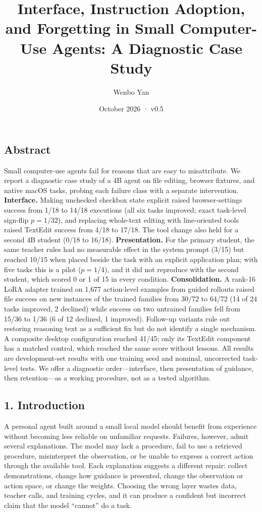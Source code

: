 \documentclass[
  10pt,
]{article}
\title{Interface, Instruction Adoption, and Forgetting in Small
Computer-Use Agents: A Diagnostic Case Study}
\author{Wenbo Yan}
\date{October 2026 · v0.5}
\begin{document}
\maketitle

\subsection{Abstract}\label{abstract}

Small computer-use agents fail for reasons that are easy to
misattribute. We report a diagnostic case study of a 4B agent on file
editing, browser fixtures, and native macOS tasks, probing each failure
class with a separate intervention. \textbf{Interface.} Making unchecked
checkbox state explicit raised browser-settings success from 1/18 to
14/18 executions (all six tasks improved; exact task-level sign-flip
\(p=1/32\)), and replacing whole-text editing with line-oriented tools
raised TextEdit success from 4/18 to 17/18. The tool change also held
for a second 4B student (0/18 to 16/18). \textbf{Presentation.} For the
primary student, the same teacher rules had no measurable effect in the
system prompt (3/15) but reached 10/15 when placed beside the task with
an explicit application plan; with five tasks this is a pilot
(\(p=1/4\)), and it did not reproduce with the second student, which
scored 0 or 1 of 15 in every condition. \textbf{Consolidation.} A
rank-16 LoRA adapter trained on 1,677 action-level examples from guided
rollouts raised file success on new instances of the trained families
from 30/72 to 64/72 (14 of 24 tasks improved, 2 declined) while success
on two untrained families fell from 15/36 to 1/36 (6 of 12 declined, 1
improved). Follow-up variants rule out restoring reasoning text as a
sufficient fix but do not identify a single mechanism. A composite
desktop configuration reached 41/45; only its TextEdit component has a
matched control, which reached the same score without lessons. All
results are development-set results with one training seed and nominal,
uncorrected task-level tests. We offer a diagnostic order---interface,
then presentation of guidance, then retention---as a working procedure,
not as a tested algorithm.

\subsection{1. Introduction}\label{introduction}

A personal agent built around a small local model should benefit from
experience without becoming less reliable on unfamiliar requests.
Failures, however, admit several explanations. The model may lack a
procedure, fail to use a retrieved procedure, misinterpret the
observation, or be unable to express a correct action through the
available tool. Each explanation suggests a different repair: collect
demonstrations, change how guidance is presented, change the observation
or action space, or change the weights. Choosing the wrong layer wastes
data, teacher calls, and training cycles, and it can produce a confident
but incorrect claim that the model ``cannot'' do a task.
\end{document}
